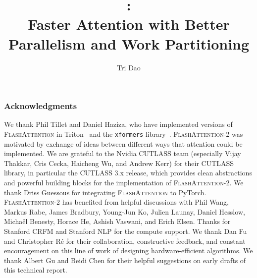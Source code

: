 \documentclass{article}
\title{\sysname:\\Faster Attention with Better Parallelism and Work Partitioning}
\author[1,2]{Tri Dao}
\affil[1]{Department of Computer Science, Princeton University}
\affil[2]{Department of Computer Science, Stanford University}
\affil[ ]{\texttt{trid@cs.stanford.edu}}
\newcommand{\sysnameone}{\textsc{FlashAttention}\xspace}
\newcommand{\sysname}{\textsc{FlashAttention-2}\xspace}
\begin{document}
\maketitle


\begin{abstract}

\end{abstract}











\subsubsection*{Acknowledgments}

We thank Phil Tillet and Daniel Haziza, who have implemented versions of
\sysnameone in Triton~\citep{tillet2019triton} and the \texttt{xformers}
library~\citep{xFormers2022}.
\sysname was motivated by exchange of ideas between different ways that
attention could be implemented.
We are grateful to the Nvidia CUTLASS team (especially Vijay Thakkar, Cris Cecka, Haicheng
Wu, and Andrew Kerr) for their CUTLASS library, in particular the CUTLASS 3.x
release, which provides clean abstractions and powerful building blocks for the
implementation of \sysname.
We thank Driss Guessous for integrating \sysnameone to PyTorch.
\sysname has benefited from helpful discussions with Phil Wang, Markus Rabe,
James Bradbury, Young-Jun Ko, Julien Launay, Daniel Hesslow, Micha{\"e}l
Benesty, Horace He, Ashish Vaswani, and Erich Elsen.
Thanks for Stanford CRFM and Stanford NLP for the compute support.
We thank Dan Fu and Christopher R{\'e} for their collaboration, constructive
feedback, and constant encouragement on this line of work of designing
hardware-efficient algorithms.
We thank Albert Gu and Beidi Chen for their helpful suggestions on early drafts
of this technical report.






\end{document}
